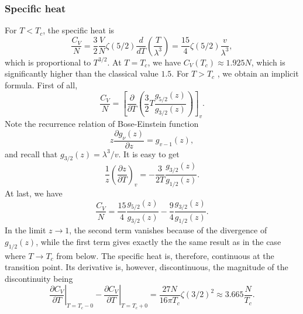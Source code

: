 \subsubsection{Specific heat}
For $T < T_c$, the specific heat is
\[\frac{C_V}{N} = \frac{3}{2}\frac{V}{N} \zeta(5/2) \frac{d}{dT} (\frac{T}{\lambda^3}) = \frac{15}{4}\zeta(5/2) \frac{v}{\lambda^3},\]
which is proportional to $T^{3/2}$. At $T = T_c$, we have $C_V (T_c) \approx 1.925N$, which is significantly higher than the classical value $1.5$. For $T > T_c$ , we obtain an implicit formula. First of all,
\[\frac{C_V}{N} = \left[ \frac{\partial }{\partial T} \left( \frac{3}{2} T \frac{g_{5/2}(z)}{g_{3/2}(z)} \right) \right]_{v}.\]
Note the recurrence relation of Bose-Einstein function
\[z\frac{\partial g_{\nu}(z)}{\partial z} = g_{v-1}(z),\]
and recall that $g_{3/2}(z) = \lambda^3/v$. It is easy to get
\[\frac{1}{z} \left(\frac{\partial z}{\partial T} \right)_v = -\frac{3}{2T} \frac{g_{3/2}(z)}{g_{1/2}(z)}.\]
At last, we have
\[\frac{C_V}{N} = \frac{15}{4} \frac{g_{5/2}(z)}{g_{3/2}(z)} -\frac{9}{4} \frac{g_{3/2}(z)}{g_{1/2}(z)} .\]
In the limit $z \to 1$, the second term vanishes because of the divergence of $g_{1/2}(z)$, while the first term gives exactly the the same result as in the case where $T \to T_c$ from below. The specific heat is, therefore, continuous at the transition point.
Its derivative is, however, discontinuous, the magnitude of the discontinuity being
\[ \left. \frac{\partial C_V}{\partial T} \right|_{T = T_c-0} -\left. \frac{\partial C_V}{\partial T} \right|_{T = T_c+0} = \frac{27N}{16\pi T_c}\zeta(3/2)^2 \approx 3.665 \frac{N}{T_c}.\]

